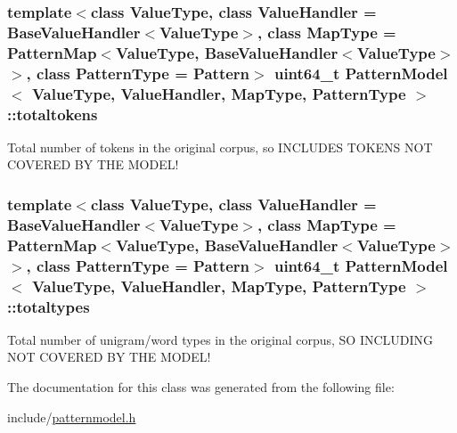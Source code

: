 \subsubsection[{totaltokens}]{\setlength{\rightskip}{0pt plus 5cm}template$<$class Value\+Type, class Value\+Handler = Base\+Value\+Handler$<$\+Value\+Type$>$, class Map\+Type = Pattern\+Map$<$\+Value\+Type, Base\+Value\+Handler$<$\+Value\+Type$>$$>$, class Pattern\+Type = Pattern$>$ uint64\+\_\+t {\bf Pattern\+Model}$<$ Value\+Type, Value\+Handler, Map\+Type, {\bf Pattern\+Type} $>$\+::totaltokens\hspace{0.3cm}{\ttfamily [protected]}}\label{classPatternModel_ada5d1db54c4e30a705aa13ce619e6d9a}


Total number of tokens in the original corpus, so I\+N\+C\+L\+U\+D\+E\+S T\+O\+K\+E\+N\+S N\+O\+T C\+O\+V\+E\+R\+E\+D B\+Y T\+H\+E M\+O\+D\+E\+L! 

\hypertarget{classPatternModel_a154c6d3c25265c2c8a40e9e78d4e09ed}{}
\subsubsection[{totaltypes}]{\setlength{\rightskip}{0pt plus 5cm}template$<$class Value\+Type, class Value\+Handler = Base\+Value\+Handler$<$\+Value\+Type$>$, class Map\+Type = Pattern\+Map$<$\+Value\+Type, Base\+Value\+Handler$<$\+Value\+Type$>$$>$, class Pattern\+Type = Pattern$>$ uint64\+\_\+t {\bf Pattern\+Model}$<$ Value\+Type, Value\+Handler, Map\+Type, {\bf Pattern\+Type} $>$\+::totaltypes\hspace{0.3cm}{\ttfamily [protected]}}\label{classPatternModel_a154c6d3c25265c2c8a40e9e78d4e09ed}


Total number of unigram/word types in the original corpus, S\+O I\+N\+C\+L\+U\+D\+I\+N\+G N\+O\+T C\+O\+V\+E\+R\+E\+D B\+Y T\+H\+E M\+O\+D\+E\+L! 



The documentation for this class was generated from the following file\+:\begin{DoxyCompactItemize}
\item 
include/\hyperlink{patternmodel_8h}{patternmodel.\+h}\end{DoxyCompactItemize}
